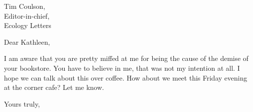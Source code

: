 \documentclass[a4paper, 10pt]{letter}
\begin{document}
\begin{letter}
{
    Tim Coulson,\\
    Editor-in-chief,\\
    Ecology Letters
}
\opening{Dear Kathleen,}
I am aware that you are pretty miffed at me for being the cause of the demise of your bookstore. You have to believe in me, that was not my intention at all.
I hope we can talk about this over coffee. How about we meet this Friday evening at the corner cafe? Let me know.
\closing{Yours truly,}
\end{letter}
\end{document}
